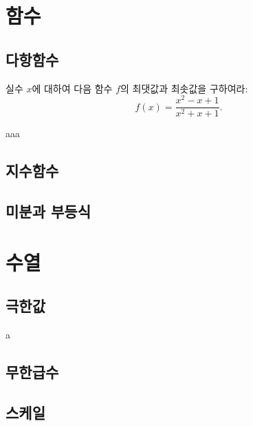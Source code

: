 \documentclass[11pt]{exam}
\begin{document}
\section{함수}
\begin{questions}

\subsection{다항함수}

\question 실수 $x$에 대하여 다음 함수 $f$의 최댓값과 최솟값을 구하여라:
\[f(x)=\frac{x^2-x+1}{x^2+x+1}.\]
\begin{sol}
aaa
\end{sol}





\subsection{지수함수}

\subsection{미분과 부등식}


\end{questions}
\section{수열}
\begin{questions}
\subsection{극한값}
\question a
\subsection{무한급수}

\subsection{스케일}


\end{questions}
\end{document}
